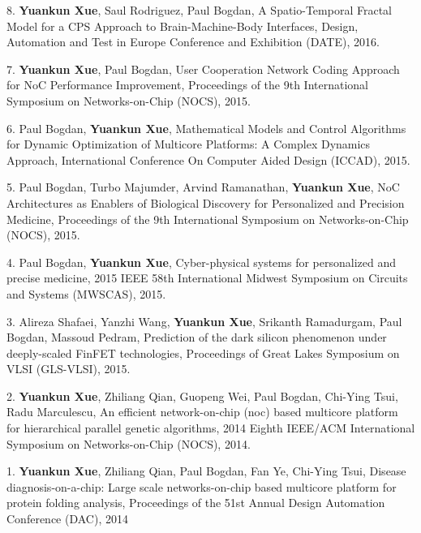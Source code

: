 \documentclass[margin,line]{cv}
\begin{document}
\begin{resume}
\begin{list}{*}{}
\item [8.] \textbf{Yuankun Xue}, Saul Rodriguez, Paul Bogdan, A Spatio-Temporal Fractal Model for a CPS Approach to Brain-Machine-Body Interfaces, Design, Automation and Test in Europe Conference and Exhibition (DATE), 2016.        
        
\item [7.] \textbf{Yuankun Xue}, Paul Bogdan, User Cooperation Network Coding Approach for NoC Performance Improvement, Proceedings of the 9th International Symposium on Networks-on-Chip (NOCS), 2015.

\item [6.] Paul Bogdan, \textbf{Yuankun Xue}, Mathematical Models and Control Algorithms for Dynamic Optimization of Multicore Platforms: A Complex Dynamics Approach, International Conference On Computer Aided Design (ICCAD), 2015.

\item [5.] Paul Bogdan, Turbo Majumder, Arvind Ramanathan, \textbf{Yuankun Xue}, NoC Architectures as Enablers of Biological Discovery for Personalized and Precision Medicine, Proceedings of the 9th International Symposium on Networks-on-Chip (NOCS), 2015.

\item [4.] Paul Bogdan, \textbf{Yuankun Xue}, Cyber-physical systems for personalized and precise medicine,  2015 IEEE 58th International Midwest Symposium on Circuits and Systems (MWSCAS), 2015.

\item [3.] Alireza Shafaei, Yanzhi Wang, \textbf{Yuankun Xue}, Srikanth Ramadurgam, Paul Bogdan, Massoud Pedram, Prediction of the dark silicon phenomenon under deeply-scaled FinFET technologies, Proceedings of Great Lakes Symposium on VLSI (GLS-VLSI), 2015.

\item [2.] \textbf{Yuankun Xue}, Zhiliang Qian, Guopeng Wei, Paul Bogdan, Chi-Ying Tsui, Radu Marculescu, An efficient network-on-chip (noc) based multicore platform for hierarchical parallel genetic algorithms,  2014 Eighth IEEE/ACM International Symposium on Networks-on-Chip  (NOCS), 2014.

\item [1.] \textbf{Yuankun Xue}, Zhiliang Qian, Paul Bogdan, Fan Ye, Chi-Ying Tsui, Disease diagnosis-on-a-chip: Large scale networks-on-chip based multicore platform for protein folding analysis, Proceedings of the 51st Annual Design Automation Conference (DAC), 2014
    

\end{list}
\end{resume}
\end{document}
